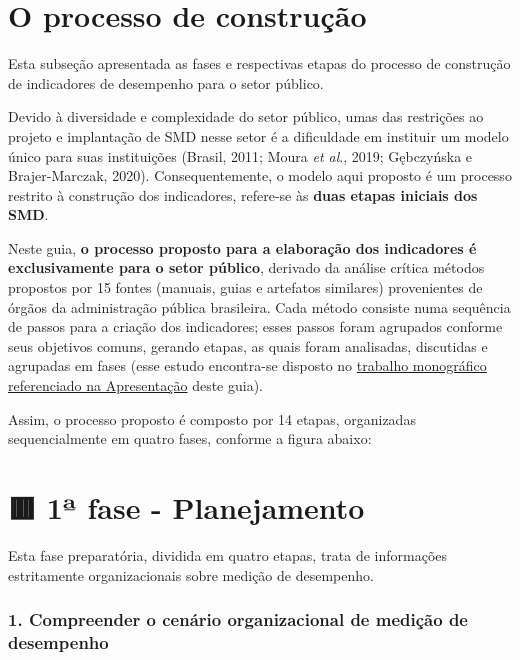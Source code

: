 \documentclass[
  letterpaper,
  DIV=11,
  numbers=noendperiod]{scrreprt}
\begin{document}
\hypertarget{o-processo-de-construuxe7uxe3o}{%
\chapter{O processo de
construção}\label{o-processo-de-construuxe7uxe3o}}

{Esta subseção apresentada as fases e respectivas etapas do processo de
construção de indicadores de desempenho para o setor público.}

Devido à diversidade e complexidade do setor público, umas das
restrições ao projeto e implantação de SMD nesse setor é a dificuldade
em instituir um modelo único para suas instituições (Brasil, 2011; Moura
\emph{et al}., 2019; Gębczyńska e Brajer-Marczak, 2020).
Consequentemente, o modelo aqui proposto é um processo restrito à
construção dos indicadores, refere-se às \textbf{duas etapas iniciais
dos SMD}.

Neste guia, \textbf{o processo proposto para a elaboração dos
indicadores é exclusivamente para o setor público}, derivado da análise
crítica métodos propostos por 15 fontes (manuais, guias e artefatos
similares) provenientes de órgãos da administração pública brasileira.
Cada método consiste numa sequência de passos para a criação dos
indicadores; esses passos foram agrupados conforme seus objetivos
comuns, gerando etapas, as quais foram analisadas, discutidas e
agrupadas em fases (esse estudo encontra-se disposto no
\href{/o/AZWDclIWFqqJuBEvyQWk/s/ws6bIBOPv2tLRHdwbB7y/~/changes/788/1.-apresentacao\#o-guia-para-a-construcao-de-indicadores-de-desempenho}{trabalho
monográfico referenciado na Apresentação} deste guia).

Assim, o processo proposto é composto por 14 etapas, organizadas
sequencialmente em quatro fases, conforme a figura abaixo:

\hypertarget{uxaa-fase---planejamento}{%
\chapter*{🟥 1ª fase - Planejamento}\label{uxaa-fase---planejamento}}


{Esta fase preparatória, dividida em quatro etapas, trata de informações
estritamente organizacionais sobre medição de desempenho.}

\hypertarget{compreender-o-cenuxe1rio-organizacional-de-mediuxe7uxe3o-de-desempenho}{%
\subsection*{1. Compreender o cenário organizacional de medição de
desempenho}\label{compreender-o-cenuxe1rio-organizacional-de-mediuxe7uxe3o-de-desempenho}}
\end{document}
